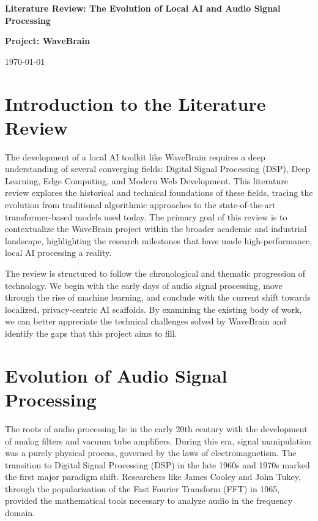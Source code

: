 \documentclass[12pt,a4paper]{article}
\begin{document}
\begin{titlepage}
    \centering
    \vspace*{2cm}
    {\Huge \textbf{Literature Review: The Evolution of Local AI and Audio Signal Processing} \par}
    \vspace{1.5cm}
    {\Large \textbf{Project: WaveBrain} \par}
    \vfill
    {\large \today \par}
\end{titlepage}

\newpage

\section{Introduction to the Literature Review}
The development of a local AI toolkit like WaveBrain requires a deep understanding of several converging fields: Digital Signal Processing (DSP), Deep Learning, Edge Computing, and Modern Web Development. This literature review explores the historical and technical foundations of these fields, tracing the evolution from traditional algorithmic approaches to the state-of-the-art transformer-based models used today. The primary goal of this review is to contextualize the WaveBrain project within the broader academic and industrial landscape, highlighting the research milestones that have made high-performance, local AI processing a reality.

The review is structured to follow the chronological and thematic progression of technology. We begin with the early days of audio signal processing, move through the rise of machine learning, and conclude with the current shift towards localized, privacy-centric AI scaffolds. By examining the existing body of work, we can better appreciate the technical challenges solved by WaveBrain and identify the gaps that this project aims to fill.

\section{Evolution of Audio Signal Processing}
The roots of audio processing lie in the early 20th century with the development of analog filters and vacuum tube amplifiers. During this era, signal manipulation was a purely physical process, governed by the laws of electromagnetism. The transition to Digital Signal Processing (DSP) in the late 1960s and 1970s marked the first major paradigm shift. Researchers like James Cooley and John Tukey, through the popularization of the Fast Fourier Transform (FFT) in 1965, provided the mathematical tools necessary to analyze audio in the frequency domain.
\end{document}
